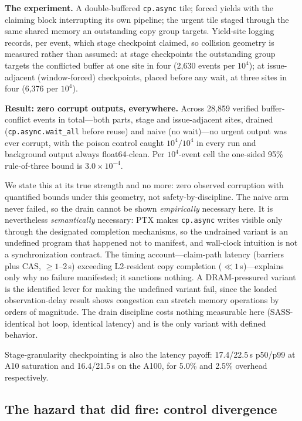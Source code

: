 \documentclass[11pt]{article}
\newcommand{\us}{\,\textmu s\xspace}
\begin{document}
\textbf{The experiment.} A double-buffered \texttt{cp.async} tile;
forced yields with the claiming block interrupting its own pipeline;
the urgent tile staged through the same shared memory an outstanding
copy group targets. Yield-site logging records, per event, which
stage checkpoint claimed, so collision geometry is measured rather
than assumed: at stage checkpoints the outstanding group targets the
conflicted buffer at one site in four (2{,}630 events per $10^4$); at
issue-adjacent (window-forced) checkpoints, placed before any wait,
at three sites in four (6{,}376 per $10^4$).

\textbf{Result: zero corrupt outputs, everywhere.} Across 28{,}859
verified buffer-conflict events in total---both parts, stage and
issue-adjacent sites, drained (\texttt{cp.async.wait\_all} before
reuse) and naive (no wait)---no urgent output was ever corrupt, with
the poison control caught $10^4/10^4$ in every run and background
output always float64-clean. Per $10^4$-event cell the one-sided 95\%
rule-of-three bound is $3.0\times10^{-4}$.

We state this at its true strength and no more: zero observed
corruption with quantified bounds under this geometry, not
safety-by-discipline. The naive arm never failed, so the drain cannot
be shown \emph{empirically} necessary here. It is nevertheless
\emph{semantically} necessary: PTX makes \texttt{cp.async} writes
visible only through the designated completion mechanisms, so the
undrained variant is an undefined program that happened not to
manifest, and wall-clock intuition is not a synchronization contract.
The timing account---claim-path latency (barriers plus CAS,
${\ge}1$--2\us) exceeding L2-resident copy completion
(${\ll}1$\us)---explains only why no failure manifested; it sanctions
nothing. A DRAM-pressured variant is the identified lever for making
the undefined variant fail, since the loaded observation-delay result
shows congestion can stretch memory operations by orders of
magnitude. The drain discipline costs nothing measurable here
(SASS-identical hot loop, identical latency) and is the only variant
with defined behavior.

Stage-granularity checkpointing is also the latency payoff:
17.4/22.5\us{} p50/p99 at A10 saturation and 16.4/21.5\us{} on the
A100, for 5.0\% and 2.5\% overhead respectively.

\subsection{The hazard that did fire: control divergence}
\label{sec:hazard}
\end{document}
